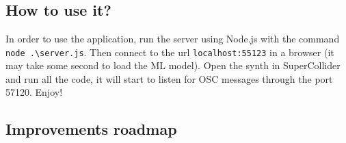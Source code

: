 \documentclass[a4paper,12pt]{report}
\begin{document}
\chapter{}
\section{How to use it?}
In order to use the application, run the server using Node.js with the command \verb"node .\server.js". Then connect to the url \verb"localhost:55123" in a browser (it may take some second to load the ML model). Open the synth in SuperCollider and run all the code, it will start to listen for OSC messages through the port 57120. Enjoy!

\section{Improvements roadmap}
\end{document}
